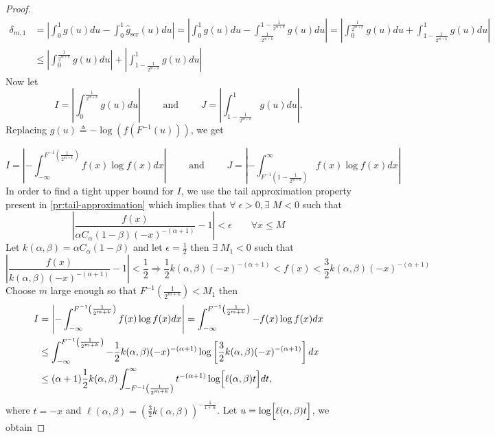 \documentclass{article}
\theoremstyle{definition}
\begin{document}
\begin{proof}
\begin{align*}
\delta_{m,1}&= \left\lvert \int_0^1g(u)du-\int_0^1\hat{g}_{\text{scr}}(u)du\right\rvert
=\left\lvert \int_0^1g(u)du-\int_{\frac{1}{2^{m+k}}}^{1-\frac{1}{2^{m+k}}} g(u)du\right\rvert=\left\lvert \int_{0}^{\frac{1}{2^{m+k}}}g(u)du+\int_{1-\frac{1}{2^{m+k}}}^{1}g(u)du\right\rvert \\
&\leq \left\lvert \int_{0}^{\frac{1}{2^{m+k}}}g(u)du\right\rvert +\left\lvert \int_{1-\frac{1}{2^{m+k}}}^{1}g(u)du\right\rvert
\end{align*}
Now let \begin{equation}
    I=\left\lvert \int_{0}^{\frac{1}{2^{m+k}}}g(u)du\right\rvert \qquad   \text{ and } \qquad J=\left\lvert \int_{1-\frac{1}{2^{m+k}}}^{1}g(u)du\right\rvert.
\end{equation} 
\noindent Replacing $g(u) \triangleq -\log(f(F^{-1}(u)))$, we get 

\begin{equation}
    I=\left\lvert -\int_{-\infty}^{F^{-1}\left(\frac{1}{2^{m+k}}\right)}f(x)\log f(x)dx\right\rvert \qquad   \text{ and } \qquad J=\left\lvert - \int_{F^{-1}\left({1-\frac{1}{2^{m+k}}}\right)}^{\infty}f(x)\log f(x)dx\right\rvert
\end{equation} 
In order to find a tight upper bound for  $I$, we use the tail approximation property present in  \eqref{pr:tail-approximation} which implies that $\forall\; \epsilon >0 ,\exists \;M < 0$ such that \begin{equation}
    \left\lvert \frac{f(x)}{\alpha C_\alpha (1-\beta) (-x)^{-(\alpha+1)}}-1 \right\rvert <\epsilon \qquad \forall x\leq  M 
\end{equation}
Let $k(\alpha,\beta)=\alpha C_\alpha (1-\beta)$ and let $\epsilon =\frac{1}{2}$ then $\exists \; M_1 < 0$ such that \begin{equation}
    \left\lvert \frac{f(x)}{k(\alpha,\beta) (-x)^{-(\alpha+1)}}-1 \right\rvert <\frac{1}{2} \Rightarrow \frac{1}{2}k(\alpha,\beta) (-x)^{-(\alpha+1)} < f(x) < \frac{3}{2}k(\alpha,\beta) (-x)^{-(\alpha+1)}
\end{equation}
Choose $m$ large enough so that $F^{-1} \left(\frac{1}{2^{m+k}}\right) < M_1$ then
\begin{align*}
I&=\left\lvert -\int_{-\infty}^{F^{-1}\left(\frac{1}{2^{m+k}}\right)}f(x)\log f(x)dx\right\rvert=\int_{-\infty}^{F^{-1}\left(\frac{1}{2^{m+k}}\right)}- f(x)\log f(x)dx\\
&\leq \int_{-\infty}^{F^{-1}\left(\frac{1}{2^{m+k}}\right)} - \frac{1}{2}k(\alpha,\beta) (-x)^{-(\alpha+1)} \log \left[\frac{3}{2}k(\alpha,\beta) (-x)^{-(\alpha+1)}\right] dx \\
&\leq (\alpha+1)\frac{1}{2}k(\alpha,\beta) \int_{-F^{-1}\left(\frac{1}{2^{m+k}}\right)}^{\infty}  t^{-(\alpha+1)} \log \Bigl[ \ell(\alpha,\beta) t\Bigl] dt,
\end{align*}
where $t = -x$ and $\ell(\alpha,\beta)=\left(\frac{3}{2}k(\alpha,\beta)\right)^{-\frac{1}{1+\alpha }}$. Let 
\(u=\log\Bigl[\ell(\alpha,\beta)t\Bigr]\), we obtain 


\end{proof}
\end{document}

